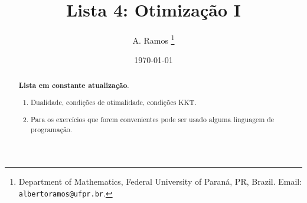 \documentclass[a4paper,latin]{article}
\begin{document}
\title{Lista 4: Otimização I }
 
\author{
A. Ramos \thanks{Department of Mathematics,
    Federal University of Paraná, PR, Brazil.
    Email: {\tt albertoramos@ufpr.br}.}
}

\date{\today}
 
\maketitle

\begin{abstract}
{\bf Lista em constante atualização}.
 \begin{enumerate}
 \item Dualidade, condições de otimalidade, condições KKT. 
 \item Para os exercícios que forem convenientes pode ser usado alguma linguagem  de programação.  
 \end{enumerate}
\end{abstract}

       
\end{document}
